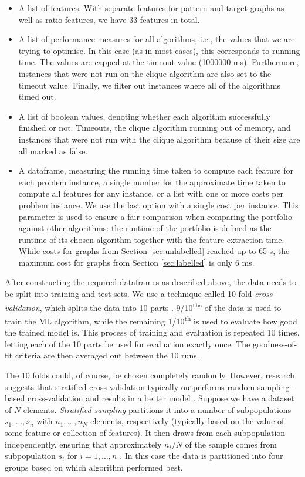 \documentclass{l4proj}
\theoremstyle{definition}
\theoremstyle{remark}
\begin{document}
\begin{itemize}
\item A list of features. With separate features for pattern and target graphs
  as well as ratio features, we have 33 features in total.
\item A list of performance measures for all algorithms, i.e., the values that
  we are trying to optimise. In this case (as in most cases), this corresponds
  to running time. The values are capped at the timeout value (\num{1000000} ms).
  Furthermore, instances that were not run on the clique algorithm are also set
  to the timeout value. Finally, we filter out instances where all of the
  algorithms timed out.
\item A list of boolean values, denoting whether each algorithm successfully
  finished or not. Timeouts, the clique algorithm running out of memory, and
  instances that were not run with the clique algorithm because of their size
  are all marked as false.
\item A dataframe, measuring the running time taken to compute each feature for
  each problem instance, a single number for the approximate time taken to
  compute all features for any instance, or a list with one or more costs per
  problem instance. We use the last option with a single cost per instance. This
  parameter is used to ensure a fair comparison when comparing the portfolio
  against other algorithms: the runtime of the portfolio is defined as the
  runtime of its chosen algorithm together with the feature extraction time.
  While costs for graphs from Section \ref{sec:unlabelled} reached up to 65 s,
  the maximum cost for graphs from Section \ref{sec:labelled} is only 6 ms.
\end{itemize} %

After constructing the required dataframes as described above, the data needs to
be split into training and test sets. We use a technique called 10-fold
\emph{cross-validation}, which splits the data into 10 parts \cite{citeulike:1304145}.
9/10\textsuperscript{ths} of the data is used to train the ML algorithm, while
the remaining 1/10\textsuperscript{th} is used to evaluate how good the trained
model is. This process of training and evaluation is repeated 10 times, letting
each of the 10 parts be used for evaluation exactly once. The goodness-of-fit
criteria are then averaged out between the 10 runs.

The 10 folds could, of course, be chosen completely randomly. However, research
suggests that stratified cross-validation typically outperforms
random-sampling-based cross-validation and results in a better model
\cite{DBLP:conf/ijcai/Kohavi95}. Suppose we have a dataset of $N$ elements.
\emph{Stratified sampling} partitions it into a number of subpopulations $s_1,
\dots, s_n$ with $n_1, \dots, n_N$ elements, respectively (typically based on
the value of some feature or collection of features). It then draws from each
subpopulation independently, ensuring that approximately $n_i/N$ of the sample
comes from subpopulation $s_i$ for $i = 1, \dots, n$ \cite{lohr2009sampling}. In
this case the data is partitioned into four groups based on which algorithm
performed best.
\end{document}
